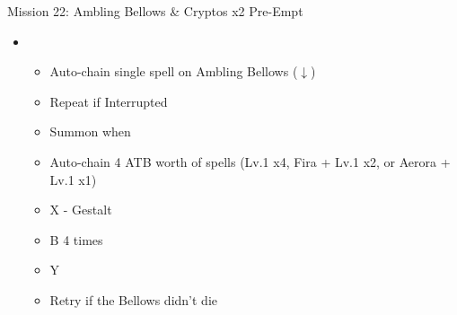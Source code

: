 \begin{multicols}{2}
  \vfill
  \begin{battle}[0:26]{Mission 22: Ambling Bellows \& Cryptos x2 Pre-Empt}
    \begin{itemize}
      \item \second
            \begin{itemize}
              \item Auto-chain single spell on Ambling Bellows ($\downarrow$)
              \item Repeat if Interrupted
              \item Summon when \stagger\
              \item Auto-chain 4 ATB worth of spells (Lv.1 x4, Fira + Lv.1 x2, or Aerora + Lv.1 x1)
              \item X - Gestalt
              \item B 4 times
              \item Y
              \item Retry if the Bellows didn't die
            \end{itemize}
    \end{itemize}
  \end{battle}

  \renewcommand{\sixth}{[6] Aggression (\com/\rav/\com)}


\end{multicols}
